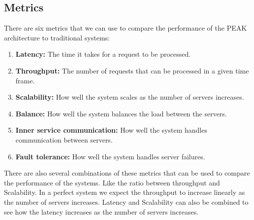\documentclass[12pt]{article}
\begin{document}
\subsection{Metrics}
There are six metrics that we can use to compare the performance of the PEAK architecture to traditional systems:
\begin{enumerate}
    \item \textbf{Latency:} The time it takes for a request to be processed.
    \item \textbf{Throughput:} The number of requests that can be processed in a given time frame.
    \item \textbf{Scalability:} How well the system scales as the number of servers increases.
    \item \textbf{Balance:} How well the system balances the load between the servers.
    \item \textbf{Inner service communication:} How well the system handles communication between servers.
    \item \textbf{Fault tolerance:} How well the system handles server failures.
\end{enumerate}
There are also several combinations of these metrics that can be used to compare the performance of the systems.
Like the ratio between throughput and Scalability. In a perfect system we expect the throughput to increase linearly as the number of servers increases.
Latency and Scalability can also be combined to see how the latency increases as the number of servers increases. 
\end{document}
